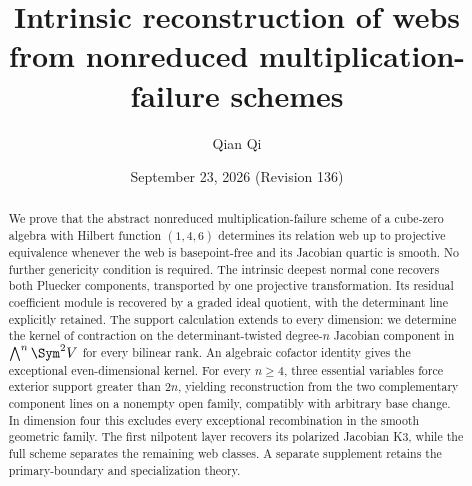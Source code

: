 \title[Intrinsic reconstruction of webs]{Intrinsic reconstruction of webs from nonreduced multiplication-failure schemes}
\author{Qian Qi}
\date{September 23, 2026 \quad (Revision 136)}
\begin{abstract}
We prove that the abstract nonreduced multiplication-failure scheme
of a cube-zero algebra with Hilbert function \((1,4,6)\) determines
its relation web up to projective equivalence whenever the web is
basepoint-free and its Jacobian quartic is smooth.  No further
genericity condition is required.  The intrinsic deepest normal cone
recovers both Pluecker components, transported by one projective
transformation.  Its residual coefficient module is recovered by a
graded ideal quotient, with the determinant line explicitly retained.
The support calculation extends to every dimension: we determine the
kernel of contraction on the determinant-twisted degree-\(n\)
Jacobian component in \(\bigwedge^n\Sym^2V\) for every bilinear rank.
An algebraic cofactor identity gives the exceptional even-dimensional
kernel.  For every \(n\ge4\), three essential variables force
exterior support greater than \(2n\), yielding reconstruction from
the two complementary component lines on a nonempty open family,
compatibly with arbitrary base change.  In dimension four this
excludes every exceptional recombination in the smooth geometric
family.  The first nilpotent layer recovers its polarized Jacobian
K3, while the full scheme separates the remaining web classes.
A separate supplement retains the primary-boundary and specialization
theory.
\end{abstract}
\maketitle
